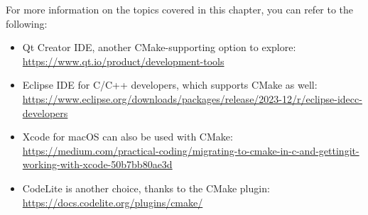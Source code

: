 For more information on the topics covered in this chapter, you can refer to the following:

\begin{itemize}
\item
Qt Creator IDE, another CMake-supporting option to explore: \url{https://www.qt.io/product/development-tools}

\item
Eclipse IDE for C/C++ developers, which supports CMake as well: \url{https://www.eclipse.org/downloads/packages/release/2023-12/r/eclipse-idecc-developers}

\item
Xcode for macOS can also be used with CMake: \url{https://medium.com/practical-coding/migrating-to-cmake-in-c-and-gettingit-working-with-xcode-50b7bb80ae3d}

\item
CodeLite is another choice, thanks to the CMake plugin: \url{https://docs.codelite.org/plugins/cmake/}
\end{itemize}






























